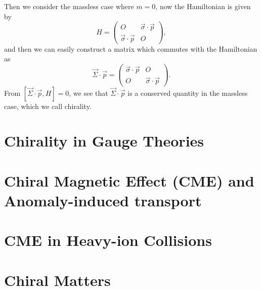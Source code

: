 \documentclass{article}
\newcommand{\be}{\begin{equation}}
\newcommand{\ee}{\end{equation}}
\newcommand{\ba}{\begin{array}}
\newcommand{\ea}{\end{array}}
\newcommand{\1}{\left}
\newcommand{\2}{\right}
\newcommand{\sig}{\sigma}
\begin{document}
Then we consider the massless case where $m=0$, now the Hamiltonian is given by 
\be
H=\1(\ba{cc}O&\vec\sig\cdot\vec p\\\vec\sig\cdot\vec p&O\ea\2),
\ee
and then we can easily construct a matrix which commutes with the Hamiltonian as
\be
\vec\Sigma\cdot\vec p =\1(\ba{cc}\vec\sig\cdot\vec p&O\\O&\vec\sig\cdot\vec p\ea\2).
\ee
From $[\vec\Sigma\cdot\vec p,H]=0$, we see that $\vec\Sigma\cdot\vec p$ is a conserved quantity in the massless case, which we call chirality.









\section{Chirality in Gauge Theories}
\section{Chiral Magnetic Effect (CME) and Anomaly-induced transport}
\section{CME in Heavy-ion Collisions}
\section{Chiral Matters}
\end{document}
